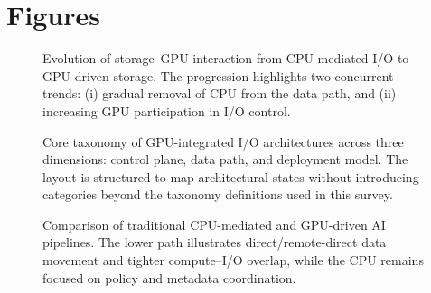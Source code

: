 \section{Figures}

\begin{figure}[t]
\centering

\caption{Evolution of storage--GPU interaction from CPU-mediated I/O to GPU-driven storage. The progression highlights two concurrent trends: (i) gradual removal of CPU from the data path, and (ii) increasing GPU participation in I/O control.}
\label{fig:evolution}
\end{figure}

\begin{figure}[t]
\centering

\caption{Core taxonomy of GPU-integrated I/O architectures across three dimensions: control plane, data path, and deployment model. The layout is structured to map architectural states without introducing categories beyond the taxonomy definitions used in this survey.}
\label{fig:taxonomy}
\end{figure}

\begin{figure}[t]
\centering

\caption{Comparison of traditional CPU-mediated and GPU-driven AI pipelines. The lower path illustrates direct/remote-direct data movement and tighter compute--I/O overlap, while the CPU remains focused on policy and metadata coordination.}
\label{fig:pipeline}
\end{figure}
